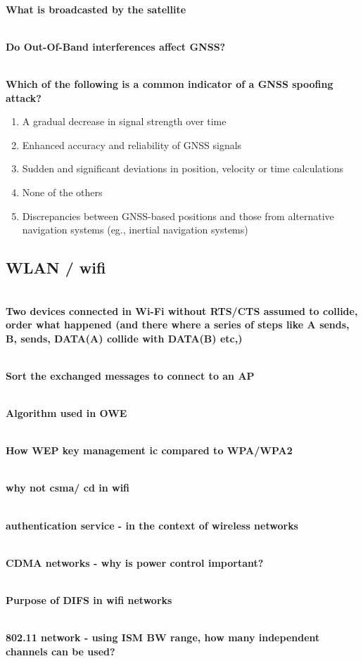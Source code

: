 \textbf{\\What is broadcasted by the satellite}

\textbf{\\Do Out-Of-Band interferences affect GNSS?}


\textbf{\\Which of the following is a common indicator of a GNSS spoofing attack?}
\begin{enumerate}
\item A gradual decrease in signal strength over time
\item Enhanced accuracy and reliability of GNSS signals
\item Sudden and significant deviations in position, velocity or time calculations
\item None of the others
\item Discrepancies between GNSS-based positions and those from alternative navigation systems (eg., inertial navigation systems)
\end{enumerate}

\subsection{WLAN / wifi}

\textbf{\\Two devices connected in Wi-Fi without RTS/CTS assumed to collide, order what happened (and there where a series of steps like A sends, B, sends, DATA(A) collide with DATA(B) etc,)}

\textbf{\\Sort the exchanged messages to connect to an AP}

\textbf{\\Algorithm used in OWE}

\textbf{\\How WEP key management ic compared to WPA/WPA2}

\textbf{\\why not csma/ cd in wifi}

\textbf{\\authentication service - in the context of wireless networks}

\textbf{\\CDMA networks - why is power control important?}

\textbf{\\Purpose of DIFS in wifi networks}


\textbf{\\802.11 network - using ISM BW range, how many independent channels can be used?}

